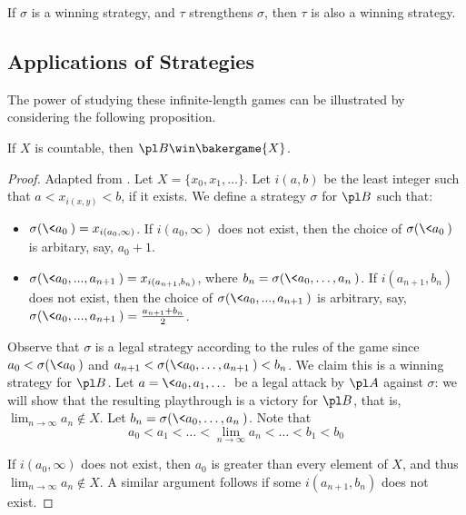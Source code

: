 \begin{prop}
  If $\sigma$ is a winning strategy, and $\tau$ strengthens $\sigma$,
  then $\tau$ is also a winning strategy.
\end{prop}

\subsection{Applications of Strategies}

The power of studying these infinite-length games can be illustrated by
considering the following proposition.

\begin{prop}
  If $X$ is countable, then $\pl B \win \bakergame{X}$.
\end{prop}

\begin{proof}
  Adapted from \cite{noMRbaker}.
  Let $X=\{x_0,x_1,\dots\}$. Let $i(a,b)$ be the least integer such that
  $a<x_{i(x,y)}<b$, if it exists. We define a strategy $\sigma$ for $\pl B$
  such that:
  \begin{itemize}
    \item $\sigma(\<a_0\>)=x_{i(a_0,\infty)}$.
          If $i(a_0,\infty)$ does not exist, then the choice of $\sigma(\<a_0\>)$
          is arbitary, say, $a_0+1$.
    \item $\sigma(\<a_0,...,a_{n+1}\>)=x_{i(a_{n+1},b_n)}$, where
          $b_n=\sigma(\<a_0,\dots,a_n\>)$.
          If $i(a_{n+1},b_n)$ does not exist, then the choice of
          $\sigma(\<a_0,...,a_{n+1}\>)$ is arbitrary, say,
          $
            \sigma(\<a_0,...,a_{n+1}\>)
              =
            \frac{a_{n+1}+b_n}{2}
          $.
  \end{itemize}

  Observe that $\sigma$ is a legal strategy according to the rules of the game
  since $a_0<\sigma(\<a_0\>)$ and $a_{n+1}<\sigma(\<a_0,\dots,a_{n+1}\>)<b_n$.
  We claim this is a winning strategy for $\pl B$. Let $a=\<a_0,a_1,\dots\>$
  be a legal attack by $\pl A$ against $\sigma$: we will show that the
  resulting playthrough is a victory for $\pl B$, that is,
  $\lim_{n\to\infty} a_n\not\in X$. Let $b_n=\sigma(\<a_0,\dots,a_n\>)$.
  Note that
    \[
      a_0<a_1<\dots<\lim_{n\to\infty}a_n<\dots<b_1<b_0
    \]

  If $i(a_0,\infty)$ does not exist, then $a_0$ is greater than every element
  of $X$, and thus
  $\lim_{n\to\infty} a_n \not\in X$. A similar argument follows if some
  $i(a_{n+1},b_n)$ does not exist.


\end{proof}
